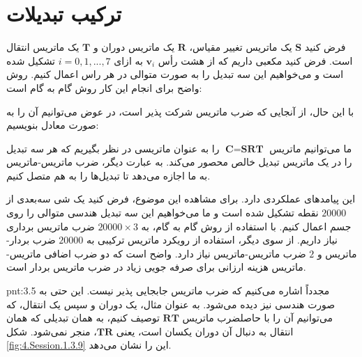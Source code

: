 \section{\textbf{ترکیب تبدیلات}}
\label{sec:3.3}
{
    \Large
    \begin{spacing}{1.5}
        فرض کنید $\textbf{S}$ یک ماتریس تغییر مقیاس، $\textbf{R}$ یک ماتریس دوران و $\textbf{T}$ یک ماتریس انتقال است.
        فرض کنید مکعبی داریم که از هشت رأس $\textbf{v}_{i}$ به ازای $i=0,1,...,7$ تشکیل شده است و
        می‌خواهیم این سه تبدیل را به صورت متوالی در هر راس اعمال کنیم. روش واضح برای انجام این کار روش گام به گام است:

        \begin{center}
        \end{center}

        با این حال، از آنجایی که ضرب ماتریس شرکت پذیر است، در عوض می‌توانیم آن را به صورت معادل بنویسیم:

        \begin{center}
        \end{center}

        ما می‌توانیم ماتریس $\textbf{C}=\textbf{SRT}$ را به عنوان ماتریسی در نظر بگیریم که هر سه تبدیل را در یک ماتریس تبدیل خالص محصور می‌کند.
        به عبارت دیگر، ضرب ماتریس-ماتریس به ما اجازه می‌دهد تا تبدیل‌ها را به هم متصل کنیم.

        این پیامدهای عملکردی دارد. برای مشاهده این موضوع، فرض کنید یک شی سه‌بعدی از $20000$ نقطه تشکیل شده است و ما می‌خواهیم این سه تبدیل هندسی متوالی را روی جسم اعمال کنیم.
        با استفاده از روش گام به گام، به $20000\times 3$ ضرب ماتریس برداری نیاز داریم.
        از سوی دیگر، استفاده از رویکرد ماتریس ترکیبی به $20000$ ضرب بردار-ماتریس و $2$ ضرب ماتریس-ماتریس نیاز دارد. واضح است که دو ضرب اضافی ماتریس-ماتریس هزینه ارزانی برای صرفه جویی زیاد در ضرب ماتریس بردار است.

        \begin{point}{pnt:3.5}
            \Large
            مجدداً اشاره می‌کنیم که ضرب ماتریس جابجایی پذیر نیست. این حتی به صورت هندسی نیز دیده می‌شود.
            به عنوان مثال، یک دوران و سپس یک انتقال، که می‌توانیم آن را با حاصلضرب ماتریس $\textbf{RT}$ توصیف کنیم، به همان تبدیلی که همان انتقال به دنبال آن دوران یکسان است، یعنی $\textbf{TR}$، منجر نمی‌شود. شکل \ref{fig:4.Session.1.3.9} این را نشان می‌دهد.
        \end{point}


\end{spacing}}
